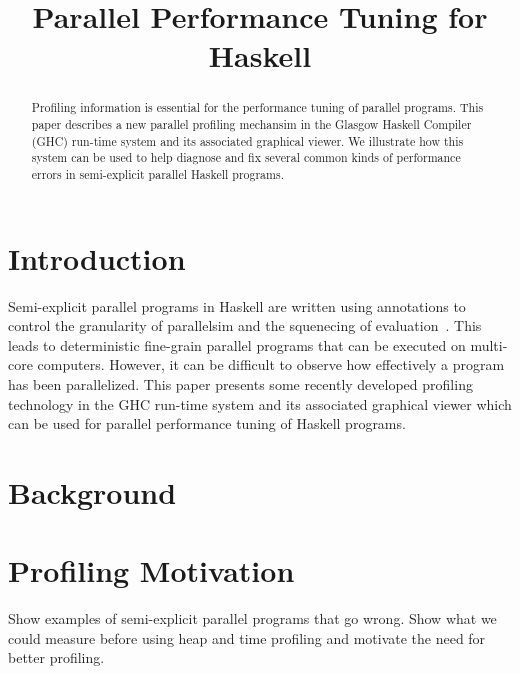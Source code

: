 \documentclass[twocolumn,9pt]{sigplanconf}
\title{Parallel Performance Tuning for Haskell}
\begin{document}
\maketitle

\begin{abstract}
Profiling information is essential for the performance tuning of parallel
programs. This paper describes a new parallel profiling mechansim in the Glasgow Haskell Compiler (GHC) run-time system and its associated graphical viewer. We illustrate how this system can be used to help diagnose and fix several common kinds of performance errors in semi-explicit parallel Haskell programs.
\end{abstract}


\section{Introduction}
Semi-explicit parallel programs in Haskell are written using annotations to control the granularity of parallelsim and the squenecing of evaluation~\cite{spj:trin98b}. This leads to deterministic fine-grain parallel programs that can be executed on multi-core computers. However, it can be difficult to observe how effectively a program has been parallelized. This paper presents some recently developed profiling technology in the GHC run-time system and its associated graphical viewer which can be used for parallel performance tuning of Haskell programs.

\section{Background}

\section{Profiling Motivation}
Show examples of semi-explicit parallel programs that go wrong. Show what we could measure before using heap and time profiling and motivate the need for better profiling.
\end{document}
